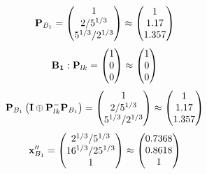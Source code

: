 \documentclass[10pt,a4paper]{article}
\begin{document}
	\[
		\bold{P}_{B_1} = 
		\begin{pmatrix}
			{1}{} \\
			{{2}} / {{5^ {1 / 3}}} \\
			{{5^ {1 / 3}}} / {{2^ {1 / 3}}} \\
		\end{pmatrix}
		\approx
		\begin{pmatrix}
			1        \\
			1.17     \\
			1.357    \\
		\end{pmatrix}
	\]
	\[
		\bold{B_1}: \bold{P}_{lk} = 
		\begin{pmatrix}
			{1}{} \\
			{{0}}{} \\
			{{0}}{} \\
		\end{pmatrix}
		\approx
		\begin{pmatrix}
			1        \\
			0        \\
			0        \\
		\end{pmatrix}
	\]
	\[
		\bold{P}_{B_1}\left(\bold{I} \oplus \bold{P}_{lk}^{-}\bold{P}_{B_1}\right) = 
		\begin{pmatrix}
			{1}{} \\
			{{2}} / {{5^ {1 / 3}}} \\
			{{5^ {1 / 3}}} / {{2^ {1 / 3}}} \\
		\end{pmatrix}
		\approx
		\begin{pmatrix}
			1        \\
			1.17     \\
			1.357    \\
		\end{pmatrix}
	\]
	\[
		\bold{x}''_{B_1} = 
		\begin{pmatrix}
			{{2^ {1 / 3}}} / {{5^ {1 / 3}}} \\
			{{16^ {1 / 3}}} / {{25^ {1 / 3}}} \\
			{1}{} \\
		\end{pmatrix}
		\approx
		\begin{pmatrix}
			0.7368   \\
			0.8618   \\
			1        \\
		\end{pmatrix}
	\]
\end{document}
